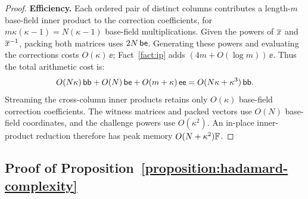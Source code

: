 \begin{proof}
\smallskip\noindent\textbf{Efficiency.}
Each ordered pair of distinct columns contributes a
length-\(m\) base-field inner product to the correction
coefficients, for \(m\kappa(\kappa-1)=N(\kappa-1)\) base-field
multiplications. Given the powers of \(\overline{x}\) and
\(\overline{x}^{-1}\), packing both matrices uses \(2N\,\mathsf{be}\).
Generating these powers and evaluating the corrections costs
\(O(\kappa)\,\ee\); Fact~\ref{fact:ip} adds
\((4m+O(\log m))\,\ee\).
Thus the total arithmetic cost is:
\[
    O(N\kappa)\,\mathsf{bb}+O(N)\,\mathsf{be}+O(m+\kappa)\,\mathsf{ee}
       =O(N\kappa+\kappa^3)\,\mathsf{bb}.
\]
Streaming the cross-column inner products retains only
\(O(\kappa)\) base-field correction coefficients.
The witness matrices and packed vectors use \(O(N)\)
base-field coordinates, and the challenge powers use
\(O(\kappa^2)\). An in-place inner-product reduction therefore
has peak memory \(O(N+\kappa^2){\mathbb{F}}\).
\end{proof}

\subsection{Proof of Proposition~\ref{proposition:hadamard-complexity}}
\label{appx:proof-hadamard}

